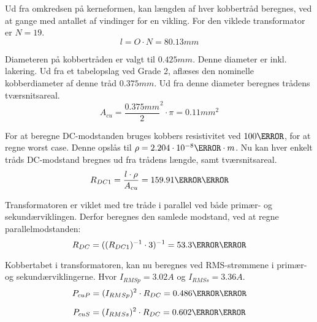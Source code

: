 Ud fra omkredsen på kerneformen, kan længden af hver kobbertråd beregnes, ved at gange med antallet af vindinger for en vikling. For den viklede transformator er $N=19$.
\begin{equation} \label{Lengde}
l = O \cdot N = 80.13mm
\end{equation}

Diameteren på kobbertråden er valgt til $0.425mm$. Denne diameter er inkl. lakering. Ud fra et tabelopslag ved Grade 2\cite{wire-diameter}, aflæses den nominelle kobberdiameter af denne tråd $0.375mm$.
Ud fra denne diameter beregnes trådens tværsnitsareal.
\begin{equation} \label{kobber-areal}
A_{cu} = \frac{0.375mm}{2}^2 \cdot \pi = 0.11mm^2
\end{equation}

For at beregne DC-modstanden bruges kobbers resistivitet ved $100\degreeCelsius$, for at regne worst case. Denne opslås til $\rho=2.204\cdot 10^{-8}\ohm \cdot m$. Nu kan hver enkelt tråds DC-modstand bregnes ud fra trådens længde, samt tværsnitsareal.
\begin{equation} \label{dc1-modstand}
R_{DC1} = \frac{l \cdot \rho}{A_{cu}} = 159.91\milli\ohm
\end{equation}

Transformatoren er viklet med tre tråde i parallel ved både primær- og sekundærviklingen. Derfor beregnes den samlede modstand, ved at regne parallelmodstanden:
\begin{equation} \label{dc-modstand}
R_{DC} = ((R_{DC1})^{-1} \cdot 3)^{-1} = 53.3\milli\ohm
\end{equation}

Kobbertabet i transformatoren, kan nu beregnes ved RMS-strømmene i primær- og sekundærviklingerne. Hvor $I_{RMSp} = 3.02A$ og $I_{RMSs} = 3.36A$.
\begin{equation} \label{dc-tab-pri}
P_{cuP} = (I_{RMSp})^2 \cdot R_{DC} = 0.486\milli\watt
\end{equation}

\begin{equation} \label{dc-tab-sek}
P_{cuS} = (I_{RMSs})^2 \cdot R_{DC} = 0.602\milli\watt
\end{equation}

